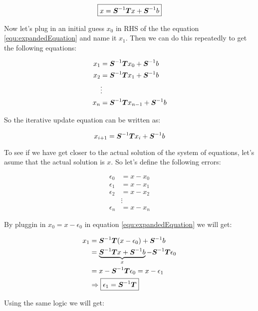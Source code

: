 \begin{equation}
	\boxed{x = \boldsymbol{S}^{-1} \boldsymbol{T} x + \boldsymbol{S}^{-1} b}
	\label{equ:expandedEquation}
\end{equation}

Now let's plug in an initial guess $x_0$ in RHS of the the equation \ref{equ:expandedEquation} and name it $x_1$. Then we can do this repeatedly to get the following equations:



\begin{align*}
	x_1 &= \boldsymbol{S}^{-1} \boldsymbol{T} x_0 + \boldsymbol{S}^{-1} b \\
	x_2 &= \boldsymbol{S}^{-1} \boldsymbol{T} x_1 + \boldsymbol{S}^{-1} b \\
	& \vdots \\
	x_n &= \boldsymbol{S}^{-1} \boldsymbol{T} x_{n-1} + \boldsymbol{S}^{-1} b
\end{align*}

So the iterative update equation can be written as:

\begin{equation}
	x_{i+1} = \boldsymbol{S}^{-1}\boldsymbol{T}x_i + \boldsymbol{S}^{-1}b
	\label{equ:updateRuleWithInv}
\end{equation}


To see if we have get closer to the actual solution of the system of equations, let's asume that the actual solution is $x$. So let's define the following errors:

\begin{align*}
	\epsilon_0 &= x - x_0 \\
	\epsilon_1 &= x - x_1 \\
	\epsilon_2 &= x - x_2 \\
	& \vdots \\
	\epsilon_n &= x - x_n 
\end{align*}

By pluggin in $x_0 = x - \epsilon_0 $ in equation \ref{equ:expandedEquation} we will get:

\begin{align*}
	x_1 &= \boldsymbol{S}^{-1} \boldsymbol{T} (x-\epsilon_0) + \boldsymbol{S}^{-1}b \\ 
	&= \underbrace{\boldsymbol{S}^{-1}\boldsymbol{T}x + \boldsymbol{S}^{-1}b}_{x} - \boldsymbol{S}^{-1}\boldsymbol{T}\epsilon_0 \\
	&= x - \boldsymbol{S}^{-1}\boldsymbol{T}\epsilon_0 = x - \epsilon_1 \\
	&\Rightarrow \boxed{ \epsilon_1 = \boldsymbol{S}^{-1}\boldsymbol{T} }
\end{align*}

Using the same logic we will get:

